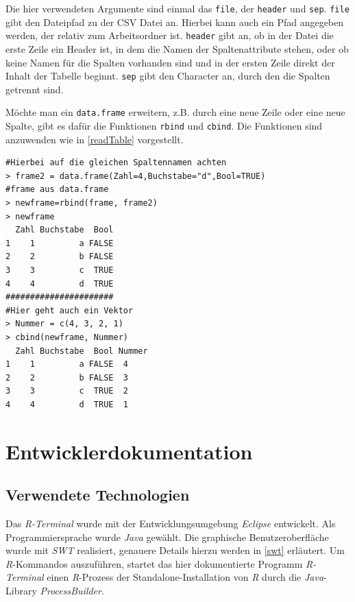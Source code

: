 \documentclass[a4paper, 12pt]{report} %
\begin{document}
Die hier verwendeten Argumente sind einmal das \texttt{file}, der \texttt{header} und \texttt{sep}. \texttt{file} gibt den Dateipfad zu der CSV Datei an. Hierbei kann auch ein Pfad angegeben werden, der relativ zum Arbeitsordner ist. \texttt{header} gibt an, ob in der Datei die erste Zeile ein Header ist, in dem die Namen der Spaltenattribute stehen, oder ob keine Namen für die Spalten vorhanden sind und in der ersten Zeile direkt der Inhalt der Tabelle beginnt. \texttt{sep} gibt den Character an, durch den die Spalten getrennt sind. 

Möchte man ein \texttt{data.frame} erweitern, z.B. durch eine neue Zeile oder eine neue Spalte, gibt es dafür die Funktionen \texttt{rbind} und \texttt{cbind}. Die Funktionen sind anzuwenden wie in \ref{readTable} vorgestellt. 

\lstset{language=R}
\begin{lstlisting}[frame=single,caption={\texttt{rbind} und \texttt{cbind}}]
#Hierbei auf die gleichen Spaltennamen achten
> frame2 = data.frame(Zahl=4,Buchstabe="d",Bool=TRUE)
#frame aus data.frame
> newframe=rbind(frame, frame2)		
> newframe
  Zahl Buchstabe  Bool
1    1         a FALSE
2    2         b FALSE
3    3         c  TRUE
4    4         d  TRUE
######################
#Hier geht auch ein Vektor
> Nummer = c(4, 3, 2, 1)
> cbind(newframe, Nummer)
  Zahl Buchstabe  Bool Nummer
1    1         a FALSE  4
2    2         b FALSE  3
3    3         c  TRUE  2
4    4         d  TRUE  1

\end{lstlisting}
\label{readTable}



\newpage

\chapter{Entwicklerdokumentation}

\section{Verwendete Technologien}

Das \textit{R-Terminal} wurde mit der Entwicklungsumgebung \textit{Eclipse} entwickelt.
Als Programmiersprache wurde \textit{Java} gewählt. Die graphische Benutzeroberfläche wurde mit \textit{SWT} realisiert, genauere Details hierzu werden in \ref{swt} erläutert.
Um \textit{R}-Kommandos auszuführen, startet das hier dokumentierte Programm \textit{R-Terminal} einen \textit{R}-Prozess der Standalone-Installation von \textit{R} durch die \textit{Java}-Library \textit{ProcessBuilder}.
\end{document}
